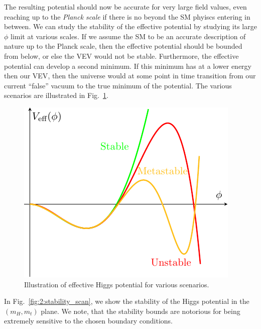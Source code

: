 The resulting potential should now be accurate for very large field values, even reaching up to the \textit{Planck scale} if there is no beyond the \acs{SM} phyiscs entering in between. We can study the stability of the effective potential by studying its large $\phi$ limit at various scales. If we assume the \acs{SM} to be an accurate description of nature up to the Planck scale, then the effective potential should be bounded from below, or else the \acs{VEV} would not be stable. Furthermore, the effective potential can develop a second minimum. If this minimum has at a lower energy then our \acs{VEV}, then the universe would at some point in time transition from our current ``false'' vacuum to the true minimum of the potential. The various scenarios are illustrated in Fig.~\ref{fig:2:Veff_illustration}.
\begin{figure}[h]
\centering
\includegraphics[scale=1.1]{Images/Veff_illustration.pdf}
\caption{Illustration of effective Higgs potential for various scenarios.}
\label{fig:2:Veff_illustration}
\end{figure}
In Fig.~\ref{fig:2:stability_scan}, we show the stability of the Higgs potential in the $(m_H, m_t)$ plane. We note, that the stability bounds are notorious for being extremely sensitive to the chosen boundary conditions.
